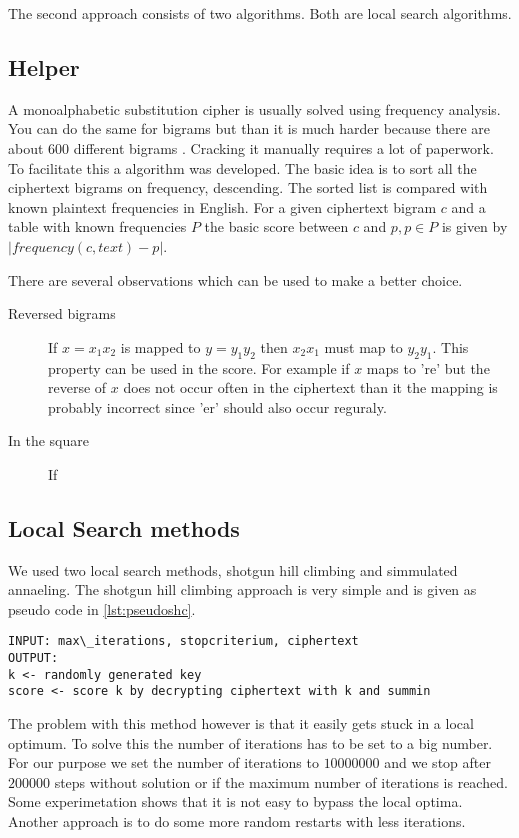 \documentclass[]{article}
\begin{document}
The second approach consists of two algorithms. Both are local search algorithms.
\subsection{Helper}
A monoalphabetic substitution cipher is usually solved using frequency analysis. You can do the same for bigrams but than it is much harder because there are about 600 different bigrams \cite{}. Cracking it manually requires a lot of paperwork. To facilitate this a algorithm was developed. The basic idea is to sort all the ciphertext bigrams on frequency, descending. The sorted list is compared with known plaintext frequencies in English. For a given ciphertext bigram $c$ and a table with known frequencies $P$ the basic score between $c$ and $p, p \in P$ is given by $|frequency(c, text) - p|$. 

There are several observations which can be used to make a better choice.
\begin{description}
	\item[Reversed bigrams] If $x=x_1x_2$ is mapped to $y=y_1y_2$ then $x_2x_1$ must map to $y_2y_1$. This property can be used in the score. For example if $x$ maps to 're' but the reverse of $x$ does not occur often in the ciphertext than it the mapping is probably incorrect since 'er' should also occur reguraly.
	\item[In the square] If 
\end{description}
\subsection{Local Search methods}
We used two local search methods, shotgun hill climbing and simmulated annaeling. The shotgun hill climbing approach is very simple and is given as pseudo code in \ref{lst:pseudoshc}.
\begin{lstlisting}
INPUT: max\_iterations, stopcriterium, ciphertext
OUTPUT: 
k <- randomly generated key
score <- score k by decrypting ciphertext with k and summin
\end{lstlisting}
The problem with this method however is that it easily gets stuck in a local optimum. To solve this the number of iterations has to be set to a big number. For our purpose we set the number of iterations to $10000000$ and we stop after $200000$ steps without solution or if the maximum number of iterations is reached. Some experimetation shows that it is not easy to bypass the local optima. Another approach is to do some more random restarts with less iterations.
\end{document}
